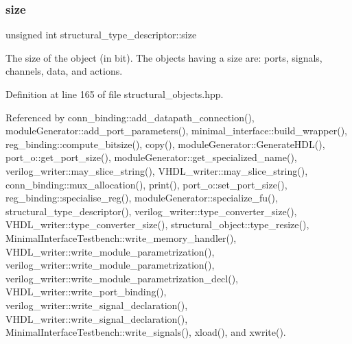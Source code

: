 \mbox{\label{structstructural__type__descriptor_ac6575b2a1c6a9ee440a58eca5dca2c96}} 
\subsubsection{\texorpdfstring{size}{size}}
{\footnotesize\ttfamily unsigned int structural\+\_\+type\+\_\+descriptor\+::size}



The size of the object (in bit). The objects having a size are\+: ports, signals, channels, data, and actions. 



Definition at line 165 of file structural\+\_\+objects.\+hpp.



Referenced by conn\+\_\+binding\+::add\+\_\+datapath\+\_\+connection(), module\+Generator\+::add\+\_\+port\+\_\+parameters(), minimal\+\_\+interface\+::build\+\_\+wrapper(), reg\+\_\+binding\+::compute\+\_\+bitsize(), copy(), module\+Generator\+::\+Generate\+H\+D\+L(), port\+\_\+o\+::get\+\_\+port\+\_\+size(), module\+Generator\+::get\+\_\+specialized\+\_\+name(), verilog\+\_\+writer\+::may\+\_\+slice\+\_\+string(), V\+H\+D\+L\+\_\+writer\+::may\+\_\+slice\+\_\+string(), conn\+\_\+binding\+::mux\+\_\+allocation(), print(), port\+\_\+o\+::set\+\_\+port\+\_\+size(), reg\+\_\+binding\+::specialise\+\_\+reg(), module\+Generator\+::specialize\+\_\+fu(), structural\+\_\+type\+\_\+descriptor(), verilog\+\_\+writer\+::type\+\_\+converter\+\_\+size(), V\+H\+D\+L\+\_\+writer\+::type\+\_\+converter\+\_\+size(), structural\+\_\+object\+::type\+\_\+resize(), Minimal\+Interface\+Testbench\+::write\+\_\+memory\+\_\+handler(), V\+H\+D\+L\+\_\+writer\+::write\+\_\+module\+\_\+parametrization(), verilog\+\_\+writer\+::write\+\_\+module\+\_\+parametrization(), verilog\+\_\+writer\+::write\+\_\+module\+\_\+parametrization\+\_\+decl(), V\+H\+D\+L\+\_\+writer\+::write\+\_\+port\+\_\+binding(), verilog\+\_\+writer\+::write\+\_\+signal\+\_\+declaration(), V\+H\+D\+L\+\_\+writer\+::write\+\_\+signal\+\_\+declaration(), Minimal\+Interface\+Testbench\+::write\+\_\+signals(), xload(), and xwrite().

\mbox{\label{structstructural__type__descriptor_aa02f9377cabbcc9359fb7f1fa77e85db}} 
